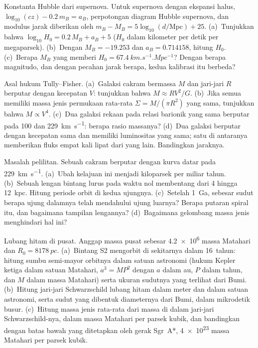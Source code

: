 \begin{exercise}[$\star\star$]\label{exo:b3:milky-way-galaxies:9}
Konstanta Hubble dari supernova. Untuk supernova dengan ekspansi
halus, $\log_{10}(cz) - 0.2\,m_B = a_B$, perpotongan diagram Hubble
supernova, dan modulus jarak diberikan oleh
$m_B - M_B = 5\log_{10}(d/\mathrm{Mpc}) + 25$. (a)~Tunjukkan bahwa
$\log_{10}H_0 = 0.2\,M_B + a_B + 5$ ($H_0$ dalam kilometer per detik per
megaparsek). (b)~Dengan $M_B = -19.253$ dan $a_B = 0.714158$, hitung $H_0$.
(c)~Berapa $M_B$ yang memberi $H_0 = \qty{67.4}{km.s^{-1}.Mpc^{-1}}$? Dengan
berapa magnitudo, dan dengan pecahan jarak berapa, kedua
kalibrasi itu berbeda?
\end{exercise}

\begin{exercise}[$\star\star\star$]\label{exo:b3:milky-way-galaxies:10}
Asal hukum Tully--Fisher. (a)~Galaksi cakram bermassa $M$
dan jari-jari $R$ berputar dengan kecepatan $V$: tunjukkan bahwa $M \approx RV^2/G$. (b)~Jika semua
 memiliki massa jenis permukaan rata-rata $\Sigma = M/(\pi R^2)$ yang sama,
tunjukkan bahwa $M \propto V^4$. (c)~Dua galaksi rekaan pada relasi barionik yang sama
berputar pada 100 dan \qty{229}{km.s^{-1}}: berapa rasio
massanya? (d)~Dua galaksi berputar dengan kecepatan sama dan memiliki luminositas yang sama;
satu di antaranya memberikan fluks empat kali lipat dari yang lain. Bandingkan
jaraknya.
\end{exercise}

\begin{exercise}[$\star\star\star$]\label{exo:b3:milky-way-galaxies:11}
Masalah pelilitan. Sebuah cakram berputar dengan kurva datar pada
\qty{229}{km.s^{-1}}. (a)~Ubah kelajuan ini menjadi kiloparsek per miliar
tahun. (b)~Sebuah lengan bintang lurus pada waktu nol membentang dari 4 hingga
\qty{12}{kpc}. Hitung periode orbit di kedua ujungnya. (c)~Setelah
\qty{1}{Ga}, sebesar sudut berapa ujung dalamnya telah mendahului ujung
luarnya? Berapa putaran spiral itu, dan bagaimana tampilan lengannya?
(d)~Bagaimana gelombang massa jenis menghindari hal ini?
\end{exercise}

\begin{exercise}[$\star\star\star$]\label{exo:b3:milky-way-galaxies:12}
Lubang hitam di pusat. Anggap massa pusat sebesar
\num{4.2e6} massa Matahari dan $R_0 = \qty{8178}{pc}$. (a)~Bintang S2
mengorbit di sekitarnya dalam \num{16}~tahun: hitung sumbu semi-mayor orbitnya dalam
satuan astronomi (hukum Kepler ketiga dalam satuan Matahari, $a^3 = MP^2$ dengan
$a$ dalam au, $P$ dalam tahun, dan $M$ dalam massa Matahari) serta ukuran sudutnya yang terlihat
dari Bumi. (b)~Hitung jari-jari Schwarzschild lubang hitam dalam
meter dan dalam satuan astronomi, serta sudut yang dibentuk diameternya
dari Bumi, dalam mikrodetik busur. (c)~Hitung massa jenis rata-rata dari
massa di dalam jari-jari Schwarzschild-nya, dalam massa Matahari per parsek
kubik, dan bandingkan dengan batas bawah yang ditetapkan oleh gerak Sgr~A*,
\num{4e23} massa Matahari per parsek kubik.
\end{exercise}

